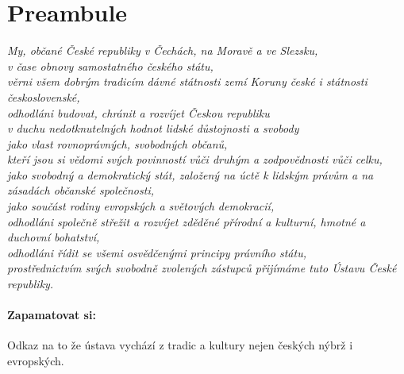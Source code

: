 \documentclass[10pt,a4paper,
twoside,%
]{report}
\begin{document}
\section{Preambule}
\begin{center}\textsl{
My, občané České republiky v Čechách, na Moravě a ve Slezsku,\\
v čase obnovy samostatného českého státu,\\
věrni všem dobrým tradicím dávné státnosti zemí Koruny české i státnosti československé,\\
odhodláni budovat, chránit a rozvíjet Českou republiku\\
v duchu nedotknutelných hodnot lidské důstojnosti a svobody\\
jako vlast rovnoprávných, svobodných občanů,\\
kteří jsou si vědomi svých povinností vůči druhým a zodpovědnosti vůči celku,\\
jako svobodný a demokratický stát, založený na úctě k lidským právům a na zásadách občanské společnosti,\\
jako součást rodiny evropských a světových demokracií,\\
odhodláni společně střežit a rozvíjet zděděné přírodní a kulturní, hmotné a duchovní bohatství,\\
odhodláni řídit se všemi osvědčenými principy právního státu,\\
prostřednictvím svých svobodně zvolených zástupců přijímáme tuto Ústavu České republiky.}
\end{center}

\paragraph{Zapamatovat si:} Odkaz na to že ústava vychází z tradic a kultury nejen českých nýbrž i evropských.
\end{document}
